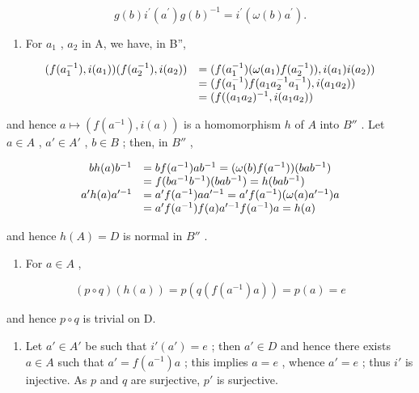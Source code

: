 \[
g (b) i ^ {\prime} \left(a ^ {\prime}\right) g (b) ^ {- 1} = i ^ {\prime} (\omega (b) a ^ {\prime}).
\]

\begin{enumerate}
\def\labelenumi{(\roman{enumi})}
\tightlist
\item
  For \(a_{1}\) , \(a_{2}\) in A, we have, in B'',
\end{enumerate}

\[
\begin{array}{r l} (f (a _ {1} ^ {- 1}), i (a _ {1})) (f (a _ {2} ^ {- 1}), i (a _ {2})) & = (f (a _ {1} ^ {- 1}) (\omega (a _ {1}) f (a _ {2} ^ {- 1})), i (a _ {1}) i (a _ {2})) \\ & = (f (a _ {1} ^ {- 1}) f (a _ {1} a _ {2} ^ {- 1} a _ {1} ^ {- 1}), i (a _ {1} a _ {2})) \\ & = (f ((a _ {1} a _ {2}) ^ {- 1}, i (a _ {1} a _ {2})) \end{array}
\]

and hence \(a \mapsto (f(a^{-1}), i(a))\) is a homomorphism \(h\) of \(A\) into \(B''\) . Let \(a \in A\) , \(a' \in A'\) , \(b \in B\) ; then, in \(B''\) ,

\[
\begin{array}{r l} b h (a) b ^ {- 1} & = b f (a ^ {- 1}) a b ^ {- 1} = (\omega (b) f (a ^ {- 1})) (b a b ^ {- 1}) \\ & = f (b a ^ {- 1} b ^ {- 1}) (b a b ^ {- 1}) = h (b a b ^ {- 1}) \\ a ^ {\prime} h (a) a ^ {\prime - 1} & = a ^ {\prime} f (a ^ {- 1}) a a ^ {\prime - 1} = a ^ {\prime} f (a ^ {- 1}) (\omega (a) a ^ {\prime - 1}) a \\ & = a ^ {\prime} f (a ^ {- 1}) f (a) a ^ {\prime - 1} f (a ^ {- 1}) a = h (a) \end{array}
\]

and hence \(h(A) = D\) is normal in \(B''\) .

\begin{enumerate}
\def\labelenumi{(\roman{enumi})}
\setcounter{enumi}{1}
\tightlist
\item
  For \(a \in A\) ,
\end{enumerate}

\[
(p \circ q) (h (a)) = p (q (f (a ^ {- 1}) a)) = p (a) = e
\]

and hence \(p \circ q\) is trivial on D.

\begin{enumerate}
\def\labelenumi{(\roman{enumi})}
\setcounter{enumi}{2}
\tightlist
\item
  Let \(a' \in A'\) be such that \(i'(a') = e\) ; then \(a' \in D\) and hence there exists \(a \in A\) such that \(a' = f(a^{-1})a\) ; this implies \(a = e\) , whence \(a' = e\) ; thus \(i'\) is injective. As \(p\) and \(q\) are surjective, \(p'\) is surjective.
\end{enumerate}

